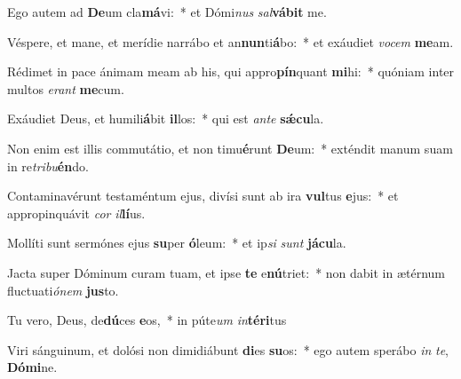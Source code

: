 \item Ego autem ad \textbf{De}um cla\textbf{má}vi:~* et Dómi\textit{nus} \textit{sal}\textbf{vá}\textbf{bit} me.
\item Véspere, et mane, et merídie narrábo et an\textbf{nun}ti\textbf{á}bo:~* et exáudiet \textit{vo}\textit{cem} \textbf{me}am.
\item Rédimet in pace ánimam meam ab his, qui appro\textbf{pín}quant \textbf{mi}hi:~* quóniam inter multos \textit{e}\textit{rant} \textbf{me}cum.
\item Exáudiet Deus, et humili\textbf{á}bit \textbf{il}los:~* qui est \textit{an}\textit{te} \textbf{sǽ}\textbf{cu}la.
\item Non enim est illis commutátio, et non timu\textbf{é}runt \textbf{De}um:~* exténdit manum suam in re\textit{tri}\textit{bu}\textbf{én}do.
\item Contaminavérunt testaméntum ejus, divísi sunt ab ira \textbf{vul}tus \textbf{e}jus:~* et appropinquávit \textit{cor} \textit{il}\textbf{lí}us.
\item Mollíti sunt sermónes ejus \textbf{su}per \textbf{ó}leum:~* et ip\textit{si} \textit{sunt} \textbf{já}\textbf{cu}la.
\item Jacta super Dóminum curam tuam, et ipse \textbf{te} e\textbf{nú}triet:~* non dabit in ætérnum fluctuati\textit{ó}\textit{nem} \textbf{jus}to.
\item Tu vero, Deus, de\textbf{dú}ces \textbf{e}os,~* in púte\textit{um} \textit{in}\textbf{tér}\textbf{i}tus
\item Viri sánguinum, et dolósi non dimidiábunt \textbf{di}es \textbf{su}os:~* ego autem sperábo \textit{in} \textit{te}, \textbf{Dó}\textbf{mi}ne.
